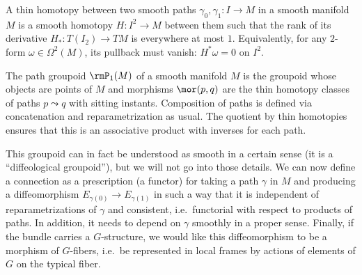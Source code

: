 \begin{defn}
    A thin homotopy between two smooth paths $\gamma_0,\gamma_1:I\to M$ in a smooth manifold $M$ is a smooth homotopy $H:I^2\to M$ between them such that the rank of its derivative $H_\ast:T(I_2)\to TM$ is everywhere at most $1$. Equivalently, for any $2$-form $\omega\in\Omega^2(M)$, its pullback must vanish: $H^\ast \omega=0$ on $I^2$.
\end{defn}

\begin{defn}
    The path groupoid $\rmP_1(M)$ of a smooth manifold $M$ is the groupoid whose objects are points of $M$ and morphisms $\mor(p,q)$ are the thin homotopy classes of paths $p\leadsto q$ with sitting instants. Composition of paths is defined via concatenation and reparametrization as usual. The quotient by thin homotopies ensures that this is an associative product with inverses for each path.
\end{defn}

This groupoid can in fact be understood as smooth in a certain sense (it is a ``diffeological groupoid''), but we will not go into those details. We can now define a connection as a prescription (a functor) for taking a path $\gamma$ in $M$ and producing a diffeomorphism $E_{\gamma(0)}\to E_{\gamma(1)}$ in such a way that it is independent of reparametrizations of $\gamma$ and consistent, i.e.\ functorial with respect to products of paths. In addition, it needs to depend on $\gamma$ smoothly in a proper sense. Finally, if the bundle carries a $G$-structure, we would like this diffeomorphism to be a morphism of $G$-fibers, i.e.\ be represented in local frames by actions of elements of $G$ on the typical fiber.

